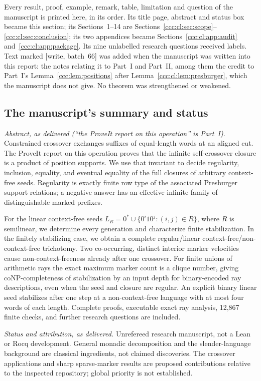 \documentclass[11pt,letterpaper]{article}
\theoremstyle{definition}
\theoremstyle{remark}
\newcommand{\wsix}{\textup{[write, batch~66]}}
\begin{document}
Every result, proof, example, remark, table, limitation and question of the
manuscript is printed here, in its order. Its title page, abstract and status
box became this section; its Sections~1--14 are
Sections~\ref{ccc:cl:sec:scope}--\ref{ccc:cl:sec:conclusion}; its two
appendices became Sections~\ref{ccc:cl:app:audit}
and~\ref{ccc:cl:app:package}. Its nine unlabelled research questions received
labels. Text marked \wsix{} was added when the manuscript was written into
this report: the notes relating it to Part~I and Part~II, among them the
credit to Part~I's Lemma~\ref{ccc:lem:positions} after
Lemma~\ref{ccc:cl:lem:presburger}, which the manuscript does not give. No
theorem was strengthened or weakened.

\subsection{The manuscript's summary and status}\label{ccc:cl:sec:abstract}

\emph{Abstract, as delivered (``the ProveIt report on this operation'' is
Part~I).} Constrained crossover exchanges suffixes of equal-length words at
an aligned cut. The ProveIt report on this operation proves that the infinite
self-crossover closure is a product of position supports. We use that
invariant to decide regularity, inclusion, equality, and eventual equality
of the full closures of arbitrary context-free seeds. Regularity is exactly
finite row type of the associated Presburger support relations; a negative
answer has an effective infinite family of distinguishable marked prefixes.

For the linear context-free seeds
$L_R=0^*\cup\{0^i1 0^j:(i,j)\in R\}$, where $R$ is semilinear,
we determine every generation and characterize finite stabilization.
In the finitely stabilizing case, we obtain a complete regular/linear
context-free/non-context-free trichotomy. Two co-occurring, distinct interior
marker velocities cause non-context-freeness already after one crossover.
For finite unions of arithmetic rays the exact maximum marker count is a
clique number, giving coNP-completeness of stabilization by an input depth
for binary-encoded ray descriptions, even when the seed and closure are
regular. An explicit binary linear seed stabilizes after one step at a
non-context-free language with at most four words of each length.
Complete proofs, executable exact ray analysis, 12,867 finite checks, and
further research questions are included.

\emph{Status and attribution, as delivered.} Unrefereed research manuscript,
not a Lean or Rocq development. General monadic decomposition and the
slender-language background are classical ingredients, not claimed
discoveries. The crossover applications and sharp sparse-marker results are
proposed contributions relative to the inspected repository; global priority
is not established.
\end{document}
